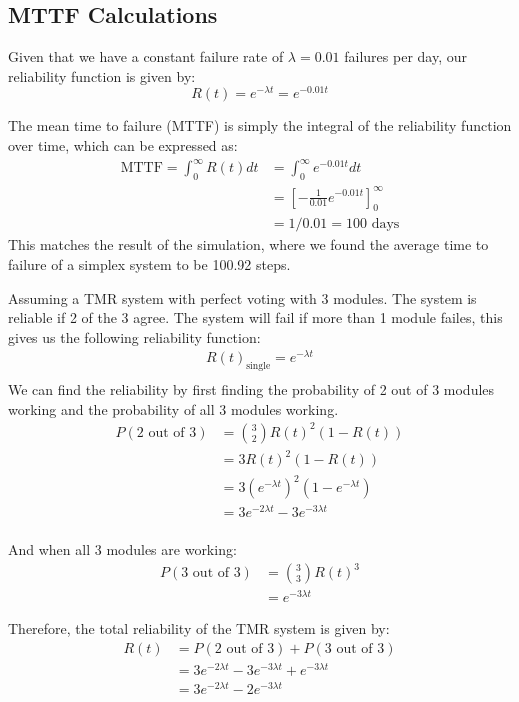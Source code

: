 \documentclass{article}
\begin{document}
\subsection{MTTF Calculations}
Given that we have a constant failure rate of $\lambda = 0.01$ failures per day, our reliability function is given by:
\begin{equation}
    R(t) = e^{-\lambda t} = e^{-0.01t}
\end{equation}

The mean time to failure (MTTF) is simply the integral of the reliability function over time, which can be expressed as:
\begin{align*}
    \text{MTTF} = \int_{0}^{\infty} R(t) dt &= \int_{0}^{\infty} e^{-0.01t} dt \\
    &= \left[-\frac{1}{0.01} e^{-0.01t}\right]_{0}^{\infty} \\
    &= 1/0.01 = 100 \text{ days}
\end{align*}
This matches the result of the simulation, where we found the average time to failure of a simplex system to be 100.92 steps.

Assuming a TMR system with perfect voting with 3 modules. The system is reliable if 2 of the 3 agree. The system will fail if more than 1 module failes, this gives us the following reliability function:
\begin{align*}
    R(t)_\text{single} = e^{-\lambda t} \\
\end{align*}
We can find the reliability by first finding the probability of 2 out of 3 modules working and the probability of all 3 modules working.
\begin{align*}
    P(\text{2 out of 3}) &= \binom{3}{2} R(t)^2 (1-R(t)) \\
    &= 3 R(t)^2 (1-R(t)) \\
    &= 3 (e^{-\lambda t})^2 (1-e^{-\lambda t}) \\
    &= 3e^{-2\lambda t} - 3e^{-3\lambda t} \\
\end{align*}

And when all 3 modules are working:
\begin{align*}
    P(\text{3 out of 3}) &= \binom{3}{3} R(t)^3 \\
    &= e^{-3\lambda t} 
\end{align*}

Therefore, the total reliability of the TMR system is given by:
\begin{align*}
    R(t) &= P(\text{2 out of 3}) + P(\text{3 out of 3}) \\
    &= 3e^{-2\lambda t} - 3e^{-3\lambda t} + e^{-3\lambda t} \\
    &= 3e^{-2\lambda t} - 2e^{-3\lambda t} \\
\end{align*}
\end{document}
